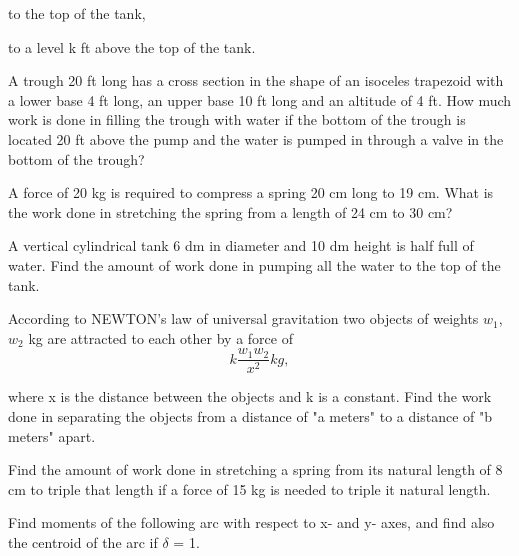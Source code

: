 \documentclass[11pt]{amsbook}
\begin{document}
    \begin{hEnumerateAlpha}
        \item to the top of the tank, 
        \item to a level k ft above the top of the tank.
    \end{hEnumerateAlpha}
    
    \begin{hEnumerateArabic}
        \setcounter{enumi}{42}
    
        \item A trough 20 ft long has a cross section in the shape of an isoceles trapezoid with a lower base 4 ft long, an upper base 10 ft long and an altitude of 4 ft. How much work is done in filling the trough with water if the bottom of the trough is located 20 ft above the pump and the water is pumped in through a valve in the bottom of the trough?
     
        \item A force of 20 kg is required to compress a spring 20 cm long to 19 cm. What is the work done in stretching the spring from a length of 24 cm to 30 cm?
        
        \item A vertical cylindrical tank 6 dm in diameter and 10 dm height is half full of water. Find the amount of work done in pumping all the water to the top of the tank.
        
        \item According to NEWTON's law of universal gravitation two objects of weights $w_{1}$, $w_{2} $ kg are attracted to each other by a force of
              $$k \frac{w_{1}w_{2}}{x^2}  kg,$$

        \noindent where x is the distance between the objects and k is a
        constant. Find the work done in separating the objects from a distance of "a meters" to a distance of "b meters" apart.
        
        \item Find the amount of work done in stretching a spring from its natural length of 8 cm to triple that length if a force of 15 kg is needed to triple it natural length.
        
        \item Find moments of the following arc with respect to x- and y- axes, and find also the centroid of the arc if $\delta$ = 1. 
    
    \end{hEnumerateArabic}
\end{document}
